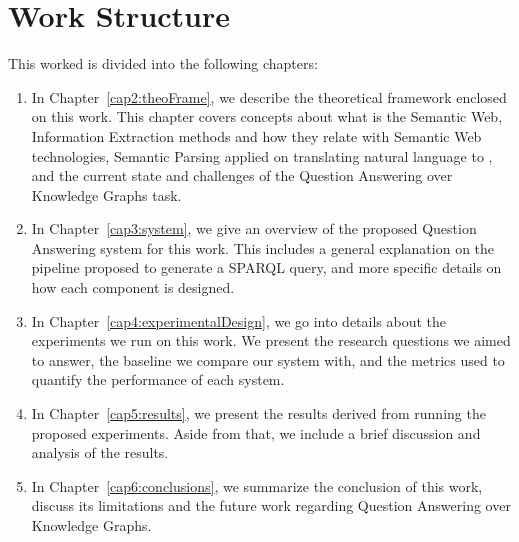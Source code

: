 \section{Work Structure}
This worked is divided into the following chapters:

\begin{enumerate}
    \item In Chapter~\ref{cap2:theoFrame}, we describe the theoretical framework 
    enclosed on this work. This chapter covers concepts about what is the Semantic 
    Web, Information Extraction methods and how they relate with Semantic Web 
    technologies, Semantic Parsing applied on translating natural language to 
    \SPARQL, and the current state and challenges of the Question Answering over 
    Knowledge Graphs task.
    \item In Chapter~\ref{cap3:system}, we give an overview of the proposed Question 
    Answering system for this work. This includes a general explanation on the 
    pipeline proposed to generate a SPARQL query, and more specific details on how 
    each component is designed.    
    \item In Chapter~\ref{cap4:experimentalDesign}, we go into details about the 
    experiments we run on this work. We present the research questions we aimed to answer, 
    the baseline we compare our system with, and the metrics used to quantify the 
    performance of each system.    
    \item In Chapter~\ref{cap5:results}, we present the results derived from running the 
    proposed experiments. Aside from that, we include a brief discussion and analysis of 
    the results.    
    \item In Chapter~\ref{cap6:conclusions}, we summarize the conclusion of this work, 
    discuss its limitations and the future work regarding Question Answering over 
    Knowledge Graphs.
    
\end{enumerate}
